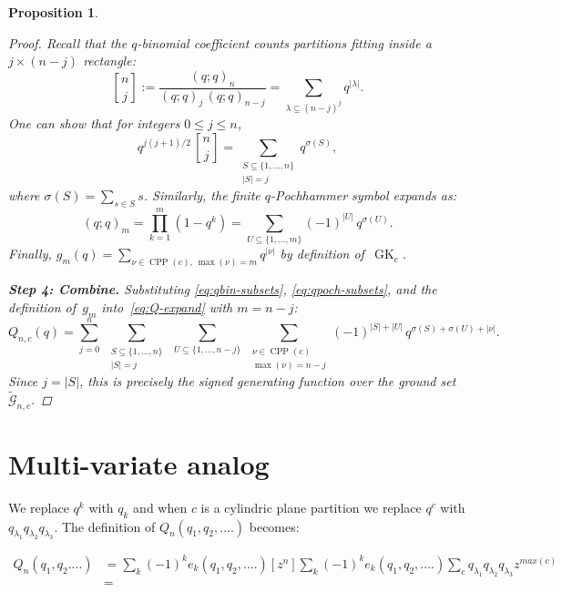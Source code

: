 \documentclass[11pt]{article}
\theoremstyle{plain}
\newtheorem{proposition}[theorem]{Proposition}
\theoremstyle{definition}
\DeclareMathOperator{\CPP}{CPP}
\newcommand{\GK}{\operatorname{GK}}
\newcommand{\qpochn}[3]{(#1;#2)_{#3}}
\newcommand{\qbin}[2]{\genfrac{[}{]}{0pt}{}{#1}{#2}}
\begin{document}
\begin{proposition}
\begin{proof}
Recall that the \emph{$q$-binomial coefficient} counts partitions fitting inside a $j \times (n{-}j)$ rectangle:
\[
  \qbin{n}{j} := \frac{\qpochn{q}{q}{n}}{\qpochn{q}{q}{j}\,\qpochn{q}{q}{n-j}} = \sum_{\lambda \subseteq (n-j)^j} q^{|\lambda|}.
\]
One can show that for integers $0 \leq j \leq n$,
\begin{equation}\label{eq:qbin-subsets}
  q^{j(j+1)/2}\,\qbin{n}{j}
  = \sum_{\substack{S \subseteq \{1,\ldots,n\} \\ |S| = j}} q^{\sigma(S)},
\end{equation}
where $\sigma(S) = \sum_{s \in S} s$.
Similarly, the finite $q$-Pochhammer symbol expands as:
\begin{equation}\label{eq:qpoch-subsets}
  \qpochn{q}{q}{m} = \prod_{k=1}^{m}(1-q^k) = \sum_{U \subseteq \{1,\ldots,m\}} (-1)^{|U|}\, q^{\sigma(U)}.
\end{equation}
Finally, $g_m(q) = \sum_{\nu \in \CPP(c),\, \max(\nu)=m} q^{|\nu|}$ by definition of~$\GK_c$.

\medskip\noindent\textbf{Step 4: Combine.}
Substituting \eqref{eq:qbin-subsets}, \eqref{eq:qpoch-subsets}, and the definition of~$g_m$ into~\eqref{eq:Q-expand} with $m = n - j$:
\[
  Q_{n,c}(q) = \sum_{j=0}^{n}\;
  \sum_{\substack{S \subseteq \{1,\ldots,n\} \\ |S|=j}}\;
  \sum_{U \subseteq \{1,\ldots,n-j\}}\;
  \sum_{\substack{\nu \in \CPP(c) \\ \max(\nu) = n-j}}
  (-1)^{|S|+|U|}\, q^{\sigma(S)+\sigma(U)+|\nu|}.
\]
Since $j = |S|$, this is precisely the signed generating function over the ground set~$\widetilde{\mathcal{G}}_{n,c}$.
\end{proof}
\end{proposition}

\newpage

\section{Multi-variate analog}

We replace $q^k$ with $q_k$ and when $c$ is a cylindric plane partition we replace $q^c$ with 
$q_{\lambda_1} q_{\lambda_2}  q_{\lambda_3}$. The definition of $Q_n(q_1, q_2, ....) $ becomes:


\begin{eqnarray} Q_n(q_1, q_2....) & = \sum_k (-1)^k e_k(q_1, q_2, ....) [z^n] \sum_k (-1)^k e_k(q_1,q_2,....) 
\sum_c q_{\lambda_1} q_{\lambda_2} q_{\lambda_3} z^{max(c)} \\
& =
\end{eqnarray}
\end{document}
